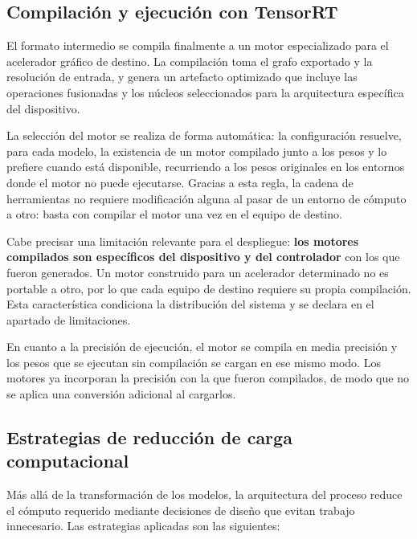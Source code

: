 \subsection{Compilación y ejecución con TensorRT}

El formato intermedio se compila finalmente a un motor especializado para el
acelerador gráfico de destino. La compilación toma el grafo exportado y la
resolución de entrada, y genera un artefacto optimizado que incluye las
operaciones fusionadas y los núcleos seleccionados para la arquitectura
específica del dispositivo.

La selección del motor se realiza de forma automática: la configuración resuelve,
para cada modelo, la existencia de un motor compilado junto a los pesos y lo
prefiere cuando está disponible, recurriendo a los pesos originales en los
entornos donde el motor no puede ejecutarse. Gracias a esta regla, la cadena de
herramientas no requiere modificación alguna al pasar de un entorno de cómputo a
otro: basta con compilar el motor una vez en el equipo de destino.

Cabe precisar una limitación relevante para el despliegue: \textbf{los motores
compilados son específicos del dispositivo y del controlador} con los que fueron
generados. Un motor construido para un acelerador determinado no es portable a
otro, por lo que cada equipo de destino requiere su propia compilación. Esta
característica condiciona la distribución del sistema y se declara en el apartado
de limitaciones.

En cuanto a la precisión de ejecución, el motor se compila en media precisión y
los pesos que se ejecutan sin compilación se cargan en ese mismo modo. Los
motores ya incorporan la precisión con la que fueron compilados, de modo que no
se aplica una conversión adicional al cargarlos.

\subsection{Estrategias de reducción de carga computacional}

Más allá de la transformación de los modelos, la arquitectura del proceso reduce
el cómputo requerido mediante decisiones de diseño que evitan trabajo
innecesario. Las estrategias aplicadas son las siguientes:

